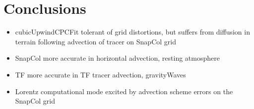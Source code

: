 \chapter{Conclusions}
\begin{itemize}
\item cubicUpwindCPCFit tolerant of grid distortions, but suffers from diffusion in terrain following advection of tracer on SnapCol grid
\item SnapCol more accurate in horizontal advection, resting atmosphere
\item TF more accurate in TF tracer advection, gravityWaves
\item Lorentz computational mode excited by advection scheme errors on the SnapCol grid
\end{itemize}
